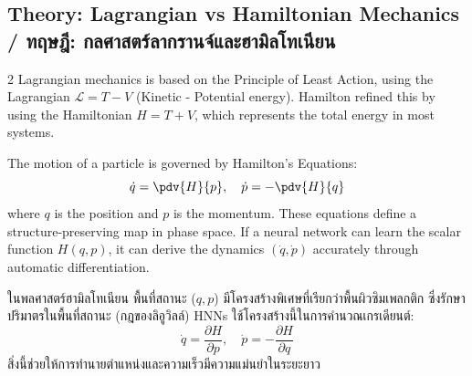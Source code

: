 \subsection{Theory: Lagrangian vs Hamiltonian Mechanics \quad / \quad \textthai{ทฤษฎี: กลศาสตร์ลากรานจ์และฮามิลโทเนียน}}
\begin{paracol}{2}
Lagrangian mechanics is based on the Principle of Least Action, using the Lagrangian $\mathcal{L} = T - V$ (Kinetic - Potential energy). Hamilton refined this by using the Hamiltonian $H = T + V$, which represents the total energy in most systems.

The motion of a particle is governed by Hamilton's Equations:
\begin{equation}
    \dot{q} = \pdv{H}{p}, \quad \dot{p} = -\pdv{H}{q}
\end{equation}
where $q$ is the position and $p$ is the momentum. These equations define a structure-preserving map in phase space. If a neural network can learn the scalar function $H(q, p)$, it can derive the dynamics $( \dot{q}, \dot{p} )$ accurately through automatic differentiation.

\switchcolumn

\begin{thai}
ในพลศาสตร์ฮามิลโทเนียน พื้นที่สถานะ ($q, p$) มีโครงสร้างพิเศษที่เรียกว่าพื้นผิวซิมเพลกติก ซึ่งรักษาปริมาตรในพื้นที่สถานะ (กฎของลิอูวิลล์) HNNs ใช้โครงสร้างนี้ในการคำนวณเกรเดียนต์:
\begin{equation}
    \dot{q} = \frac{\partial H}{\partial p}, \quad \dot{p} = -\frac{\partial H}{\partial q}
\end{equation}
สิ่งนี้ช่วยให้การทำนายตำแหน่งและความเร็วมีความแม่นยำในระยะยาว
\end{thai}
\end{paracol}
